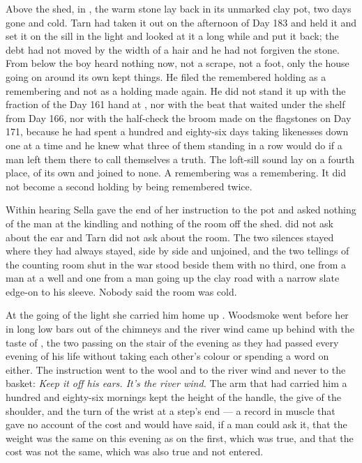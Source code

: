 Above the shed, in , the warm stone lay back in its unmarked clay pot, two days gone and cold. Tarn had taken it out on the afternoon of Day 183 and held it and set it on the sill in the light and looked at it a long while and put it back; the debt had not moved by the width of a hair and he had not forgiven the stone. From below the boy heard nothing now, not a scrape, not a foot, only the house going on around its own kept things. He filed the remembered holding as a remembering and not as a holding made again. He did not stand it up with the fraction of the Day 161 hand at , nor with the beat that waited under the shelf from Day 166, nor with the half-check the broom made on the flagstones on Day 171, because he had spent a hundred and eighty-six days taking likenesses down one at a time and he knew what three of them standing in a row would do if a man left them there to call themselves a truth. The loft-sill sound lay on a fourth place, of its own and joined to none. A remembering was a remembering. It did not become a second holding by being remembered twice.

Within hearing Sella gave the end of her instruction to the pot and asked nothing of the man at the kindling and nothing of the room off the shed.  did not ask about the ear and Tarn did not ask about the room. The two silences stayed where they had always stayed, side by side and unjoined, and the two tellings of the counting room shut in the war stood beside them with no third, one from a man at a well and one from a man going up the clay road with a narrow slate edge-on to his sleeve. Nobody said the room was cold.

At the going of the light she carried him home up . Woodsmoke went before her in long low bars out of the chimneys and the river wind came up behind with the taste of , the two passing on the stair of the evening as they had passed every evening of his life without taking each other's colour or spending a word on either. The instruction went to the wool and to the river wind and never to the basket: \emph{Keep it off his ears. It's the river wind.} The arm that had carried him a hundred and eighty-six mornings kept the height of the handle, the give of the shoulder, and the turn of the wrist at a step's end --- a record in muscle that gave no account of the cost and would have said, if a man could ask it, that the weight was the same on this evening as on the first, which was true, and that the cost was not the same, which was also true and not entered.

